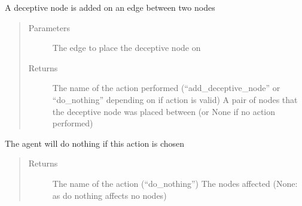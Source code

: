 \documentclass[letterpaper,10pt,english]{sphinxmanual}
\begin{document}
\begin{fulllineitems}
\begin{fulllineitems}
\sphinxAtStartPar
A deceptive node is added on an edge between two nodes
\begin{quote}\begin{description}
\item[{Parameters}] \leavevmode
\sphinxAtStartPar
{} \textendash{} The edge to place the deceptive node on

\item[{Returns}] \leavevmode
\sphinxAtStartPar
The name of the action performed (“add\_deceptive\_node” or “do\_nothing” depending on if action is valid)
A pair of nodes that the deceptive node was placed between (or None if no action performed)

\end{description}\end{quote}

\end{fulllineitems}


\begin{fulllineitems}
\label{\detokenize{source/yawning_titan.envs.generic.core:yawning_titan.envs.generic.core.blue_action_set.BlueActionSet.do_nothing}}
\sphinxAtStartPar
The agent will do nothing if this action is chosen
\begin{quote}\begin{description}
\item[{Returns}] \leavevmode
\sphinxAtStartPar
The name of the action (“do\_nothing”)
The nodes affected (None: as do nothing affects no nodes)

\end{description}\end{quote}

\end{fulllineitems}



\end{fulllineitems}
\end{document}
